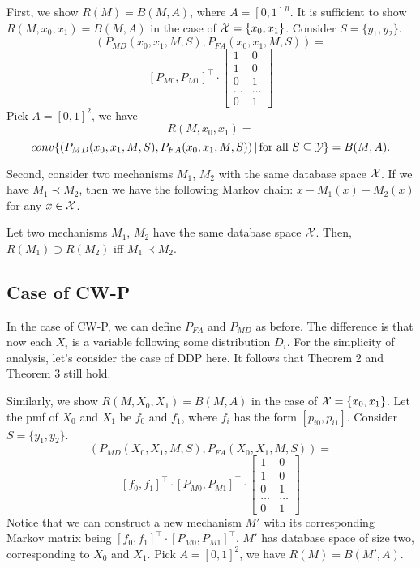 \documentclass[11pt]{article}
\begin{document}
 First, we show $R(M) = B(M, A)$, where $A = [0,1]^{n}$. It is sufficient to show $R(M, x_{0}, x_{1}) = B(M, A)$ in the case of ${\cal X} = \{x_{0}, x_{1}\}$. Consider $S= \{y_{1}, y_{2}\}$. 
 \[
 (P_{MD}(x_{0}, x_{1}, M, S), P_{FA}(x_{0}, x_{1}, M, S))=
 \]
 \[
 [P_{M0}, P_{M1}]^{\top} \cdot \begin{bmatrix}
       1 &  0           \\[0.3em]
       1 & 0           \\[0.3em]
       0 & 1           \\[0.3em]
       \dots           & \dots  \\[0.3em]
       0           & 1
     \end{bmatrix}
 \]
 Pick $A = [0,1]^{2}$, we have
 \[R(M, x_{0}, x_{1})= \]
 \[conv \{(P_{MD}(x_{0}, x_{1}, M, S), P_{FA}(x_{0}, x_{1}, M, S)) \,|\, \text{for all }S \subseteq {\cal Y} \} = B(M, A).\]
 
 Second, consider two mechanisms $M_{1}$, $M_{2}$ with the same database space $\cal X$. If we have $M_{1} \prec M_{2}$, then we have the following Markov chain: $x - M_{1}(x) - M_{2}(x)$ for any $x \in {\cal X}$.
 
\begin{theorem}
Let two mechanisms $M_{1}$, $M_{2}$ have the same database space $\cal X$. Then, $R(M_{1}) \supset R(M_{2})$ iff $M_{1} \prec M_{2}$.
\end{theorem}
\subsection{Case of CW-P}
In the case of CW-P, we can define $P_{FA}$ and $P_{MD}$ as before. The difference is that now each $X_{i}$ is a variable following some distribution $D_{i}$. For the simplicity of analysis, let's consider the case of DDP here. It follows that Theorem 2 and Theorem 3 still hold.

Similarly, we show $R(M, X_{0}, X_{1}) = B(M, A)$ in the case of ${\cal X} = \{x_{0}, x_{1}\}$. Let the pmf of $X_{0}$ and $X_{1}$ be $f_{0}$ and $f_{1}$, where $f_{i}$ has the form $[p_{i0}, p_{i1}]$. Consider $S= \{y_{1}, y_{2}\}$.
\[
 (P_{MD}(X_{0}, X_{1}, M, S), P_{FA}(X_{0}, X_{1}, M, S))=
 \]
 \[
 [f_{0}, f_{1}]^{\top} \cdot [P_{M0}, P_{M1}]^{\top} \cdot \begin{bmatrix}
       1 &  0           \\[0.3em]
       1 & 0           \\[0.3em]
       0 & 1           \\[0.3em]
       \dots           & \dots  \\[0.3em]
       0           & 1
     \end{bmatrix}
 \]
Notice that we can construct a new mechanism $M'$ with its corresponding Markov matrix being $ [f_{0}, f_{1}]^{\top} \cdot [P_{M0}, P_{M1}]^{\top}$. $M'$ has database space of size two, corresponding to $X_{0}$ and $X_{1}$. Pick $A=[0,1]^{2}$, we have $R(M) = B(M', A)$.
\end{document}

